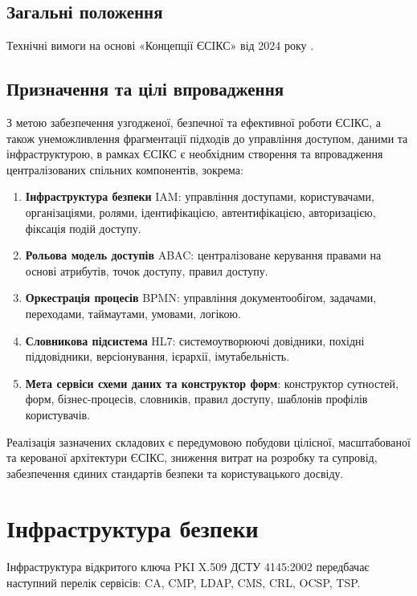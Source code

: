 \documentclass{article}
\begin{document}
\newpage
\subsection*{Загальні положення}

Технічні вимоги на основі «Концепції ЄСІКС» від 2024 року \cite{esiks}.

\subsection*{Призначення та цілі впровадження}

З метою забезпечення узгодженої, безпечної та ефективної роботи ЄСІКС,
а також унеможливлення фрагментації підходів до управління доступом,
даними та інфраструктурою, в рамках ЄСІКС є необхідним створення
та впровадження централізованих спільних компонентів, зокрема:

\begin{enumerate}
\item \textbf{Інфраструктура безпеки} IAM: управління доступами, користувачами, організаціями, ролями, ідентифікацією, автентифікацією, авторизацією, фіксація подій доступу.
\item \textbf{Рольова модель доступів} ABAC: централізоване керування правами на основі атрибутів, точок доступу, правил доступу.
\item \textbf{Оркестрація процесів} BPMN: управління документообігом, задачами, переходами, таймаутами, умовами, логікою.
\item \textbf{Словникова підсистема} HL7: системоутворюючі довідники, похідні піддовідники, версіонування, ієрархії, імутабельність.
\item \textbf{Мета сервіси схеми даних та конструктор форм}: конструктор сутностей, форм, бізнес-процесів, словників, правил доступу, шаблонів профілів користувачів.
\end{enumerate}

Реалізація зазначених складових є передумовою побудови цілісної, масштабованої та керованої архітектури ЄСІКС, зниження витрат на розробку та супровід, забезпечення єдиних стандартів безпеки та користувацького досвіду.

\section{Інфраструктура безпеки}
Інфраструктура відкритого ключа PKI X.509 ДСТУ 4145:2002 передбачає наступний перелік сервісів: CA, CMP, LDAP, CMS, CRL, OCSP, TSP.
\end{document}

